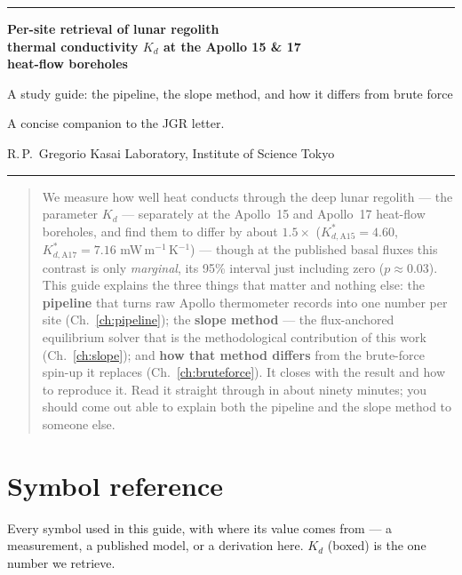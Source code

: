 \documentclass[11pt]{report}
\begin{document}
\thispagestyle{empty}
\begingroup\color{forest}\hrule height 2.5pt\endgroup
\vspace{8pt}
{\sffamily\bfseries\color{forest}\LARGE Per-site retrieval of lunar regolith\\[2pt]
thermal conductivity $K_d$ at the Apollo 15 \& 17\\[2pt]
heat-flow boreholes\par}
\vspace{6pt}
{\sffamily\Large\color{char} A study guide: the pipeline, the slope method, and how it differs from brute force\par}
\vspace{6pt}
{\color{dim}\large A concise companion to the JGR letter.\par}
\vspace{4pt}
{\color{char} R.\,P.\ Gregorio \quad\textbullet\quad Kasai Laboratory, Institute of Science Tokyo}
\vspace{6pt}
\begingroup\color{rulec}\hrule height 1pt\endgroup
\vspace{8pt}

\begin{abstract}
\noindent
We measure how well heat conducts through the deep lunar regolith --- the
parameter $K_d$ --- separately at the Apollo~15 and Apollo~17 heat-flow
boreholes, and find them to differ by about $1.5\times$
($K_{d,\mathrm{A15}}^{*}=4.60$, $K_{d,\mathrm{A17}}^{*}=7.16$
mW\,m$^{-1}$\,K$^{-1}$) --- though at the published basal fluxes this contrast is
only \emph{marginal}, its 95\% interval just including zero ($p\approx0.03$). This guide explains the three things that matter and
nothing else: the \textbf{pipeline} that turns raw Apollo thermometer records
into one number per site (Ch.~\ref{ch:pipeline}); the \textbf{slope method} ---
the flux-anchored equilibrium solver that is the methodological contribution of
this work (Ch.~\ref{ch:slope}); and \textbf{how that method differs} from the
brute-force spin-up it replaces (Ch.~\ref{ch:bruteforce}). It closes with the
result and how to reproduce it. Read it straight through in about ninety
minutes; you should come out able to explain both the pipeline and the slope
method to someone else.
\end{abstract}

\vspace{4pt}
\tableofcontents
\clearpage

\chapter*{Symbol reference}
\noindent Every symbol used in this guide, with where its value comes from ---
a measurement, a published model, or a derivation here. $K_d$ (boxed) is the one
number we retrieve.
\end{document}
